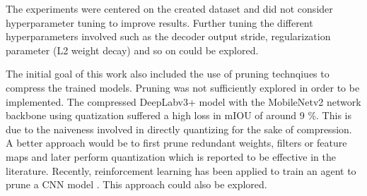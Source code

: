 The experiments were centered on the created dataset and did not consider hyperparameter tuning to improve results. Further tuning the different hyperparameters involved such as the decoder output stride, regularization parameter (L2 weight decay) and so on could be explored. 

The initial goal of this work also included the use of pruning technqiues to compress the trained models. Pruning was not sufficiently explored in order to be implemented. The compressed DeepLabv3+ model with the MobileNetv2 network backbone using quatization suffered a high loss in mIOU of around 9 \%. This is due to the naiveness involved in directly quantizing for the sake of compression. A better approach would be to first prune redundant weights, filters or feature maps and later perform quantization which is reported to be effective in the literature. Recently, reinforcement learning has been applied to train an agent to prune a CNN model \cite{DBLP:journals/corr/abs-1801-07365}. This approach could also be explored.

